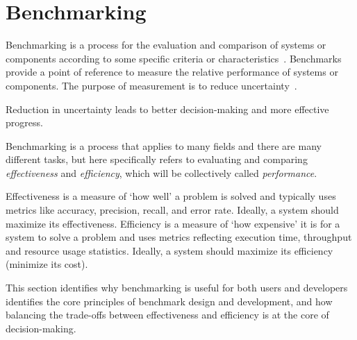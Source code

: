 \section{Benchmarking}
\label{section:31_related-benchmarking}

Benchmarking is a process for the evaluation and comparison of systems or components according to some specific criteria or characteristics~\cite{Kistowski2015}.
Benchmarks provide a point of reference to measure the relative performance of systems or components. 
The purpose of measurement is to reduce uncertainty~\cite{Hubbard2014}.

Reduction in uncertainty leads to better decision-making and more effective progress. 

Benchmarking is a process that  applies to many fields and there are many different tasks,  but here specifically refers to evaluating and comparing \gai \textit{effectiveness} and \textit{efficiency}, which will be collectively called \textit{performance}.

Effectiveness is a measure of `how well' a problem is solved and typically uses metrics like accuracy, precision, recall, and error rate.
Ideally, a system should maximize its effectiveness. 
Efficiency is a measure of `how expensive' it is for a system to solve a problem and uses metrics reflecting execution time, throughput and resource usage statistics. 
Ideally, a system should maximize its efficiency (minimize its cost).

This section identifies why benchmarking is useful for both users and developers identifies the core principles of benchmark design and development, and how balancing the trade-offs between effectiveness and efficiency is at the core of decision-making. 


